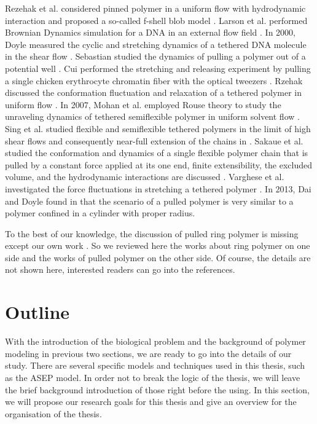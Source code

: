 Rezehak et al. considered pinned polymer in a uniform flow with hydrodynamic interaction and proposed a so-called f-shell blob model \cite{Rzehak1999}. Larson et al. performed Brownian Dynamics simulation for a DNA in an external flow field \cite{Larson1999}. In 2000, Doyle measured the cyclic and stretching dynamics of a tethered DNA molecule in the shear flow \cite{Doyle2000, Ladoux2000a}. Sebastian studied the dynamics of pulling a polymer out of a potential well \cite{Sebastian2000}. Cui performed the stretching and releasing experiment by pulling a single chicken erythrocyte chromatin fiber with the optical tweezers \cite{Cui2000a}. Rzehak discussed the conformation fluctuation and relaxation of a tethered polymer in uniform flow \cite{Rzehak2003a}. In 2007, Mohan et al. employed Rouse theory to study the unraveling dynamics of tethered semiflexible polymer in uniform solvent flow \cite{Mohan2007}. Sing et al. studied flexible and semiflexible tethered polymers in the limit of high shear flows and consequently near-full extension of the chains in \cite{Sing2011}.  Sakaue et al. studied the conformation and dynamics of a single flexible polymer chain that is pulled by a constant force applied at its one end, finite extensibility, the excluded volume, and the hydrodynamic interactions are discussed \cite{Sakaue2012a}.  Varghese et al. investigated the force fluctuations in stretching a tethered polymer \cite{Varghese2013}.
In 2013, Dai and Doyle found in \cite{Dai2013a} that the scenario of a pulled polymer is very similar to a polymer confined in a cylinder with proper radius.

To the best of our knowledge, the discussion of pulled ring polymer is missing except our own work \cite{Lin2015}. So we reviewed here the works about ring polymer on one side and the works of pulled polymer on the other side. Of course, the details are not shown here, interested readers can go into the references.

\section{Outline}  %
\label{sec:outline}
With the introduction of the biological problem and the background of polymer modeling in previous two sections, we are ready to go into the details of our study. There are several specific models and techniques used in this thesis, such as the ASEP model. In order not to break the logic of the thesis, we will leave the brief background introduction of those right before the using. In this section, we will propose our research goals for this thesis and give an overview for the organisation of the thesis.

